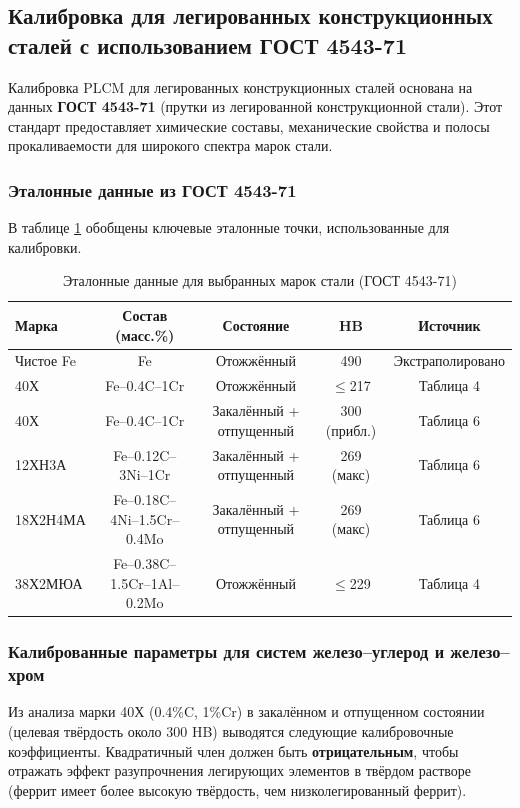 \documentclass[12pt,a4paper]{article}
\begin{document}
	
	\subsection{Калибровка для легированных конструкционных сталей с использованием ГОСТ 4543-71}
	\label{subsec:steel_calibration_gost4543}
	
	Калибровка PLCM для легированных конструкционных сталей основана на данных \textbf{ГОСТ 4543-71} (прутки из легированной конструкционной стали). Этот стандарт предоставляет химические составы, механические свойства и полосы прокаливаемости для широкого спектра марок стали.
	
	\subsubsection{Эталонные данные из ГОСТ 4543-71}
	В таблице \ref{tab:steel_gost4543} обобщены ключевые эталонные точки, использованные для калибровки.
	
	\begin{table}[htbp]
		\centering
		\caption{Эталонные данные для выбранных марок стали (ГОСТ 4543-71)}
		\label{tab:steel_gost4543}
		\begin{tabular}{lcccc}
			\toprule
			\textbf{Марка} & \textbf{Состав (масс.\%)} & \textbf{Состояние} & \textbf{HB} & \textbf{Источник} \\
			\midrule
			Чистое Fe & Fe & Отожжённый & 490 & Экстраполировано \\
			40Х & Fe–0.4C–1Cr & Отожжённый & $\le$217 & Таблица 4 \\
			40Х & Fe–0.4C–1Cr & Закалённый + отпущенный & 300 (прибл.) & Таблица 6 \\
			12ХН3А & Fe–0.12C–3Ni–1Cr & Закалённый + отпущенный & 269 (макс) & Таблица 6 \\
			18Х2Н4МА & Fe–0.18C–4Ni–1.5Cr–0.4Mo & Закалённый + отпущенный & 269 (макс) & Таблица 6 \\
			38Х2МЮА & Fe–0.38C–1.5Cr–1Al–0.2Mo & Отожжённый & $\le$229 & Таблица 4 \\
			\bottomrule
		\end{tabular}
	\end{table}
	
	\subsubsection{Калиброванные параметры для систем железо–углерод и железо–хром}
	Из анализа марки 40Х (0.4\%C, 1\%Cr) в закалённом и отпущенном состоянии (целевая твёрдость около 300 HB) выводятся следующие калибровочные коэффициенты. Квадратичный член должен быть \textbf{отрицательным}, чтобы отражать эффект разупрочнения легирующих элементов в твёрдом растворе (феррит имеет более высокую твёрдость, чем низколегированный феррит).
	
\end{document}
